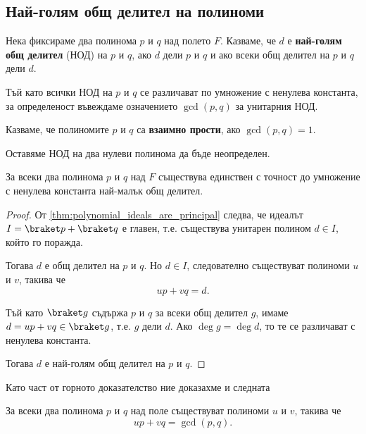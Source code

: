 \documentclass{../../common/topic}
\begin{document}
\subsection{Най-голям общ делител на полиноми}

\begin{definition}
  Нека фиксираме два полинома \( p \) и \( q \) над полето \( F \). Казваме, че \( d \) е \textbf{най-голям общ делител} (НОД) на \( p \) и \( q \), ако \( d \) дели \( p \) и \( q \) и ако всеки общ делител на \( p \) и \( q \) дели \( d \).

  Тъй като всички НОД на \( p \) и \( q \) се различават по умножение с ненулева константа, за определеност въвеждаме означението \( \gcd(p, q) \) за унитарния НОД.

  Казваме, че полиномите \( p \) и \( q \) са \textbf{взаимно прости}, ако \( \gcd(p, q) = 1 \).

  Оставяме НОД на два нулеви полинома да бъде неопределен.
\end{definition}

\begin{theorem}
  За всеки два полинома \( p \) и \( q \) над \( F \) съществува единствен с точност до умножение с ненулева константа най-малък общ делител.
\end{theorem}
\begin{proof}
  От \cref{thm:polynomial_ideals_are_principal} следва, че идеалът \( I = \braket p + \braket q \) е главен, т.е. съществува унитарен полином \( d \in I \), който го поражда.

  Тогава \( d \) е общ делител на \( p \) и \( q \). Но \( d \in I \), следователно съществуват полиноми \( u \) и \( v \), такива че
  \begin{equation*}
    u p + v q = d.
  \end{equation*}

  Тъй като \( \braket g \) съдържа \( p \) и \( q \) за всеки общ делител \( g \), имаме \( d = u p + v q \in \braket g \), т.е. \( g \) дели \( d \). Ако \( \deg g = \deg d \), то те се различават с ненулева константа.

  Тогава \( d \) е най-голям общ делител на \( p \) и \( q \).
\end{proof}

Като част от горното доказателство ние доказахме и следната
\begin{theorem}
  За всеки два полинома \( p \) и \( q \) над поле съществуват полиноми \( u \) и \( v \), такива че
  \begin{equation*}
    u p + v q = \gcd(p, q).
  \end{equation*}
\end{theorem}
\end{document}
